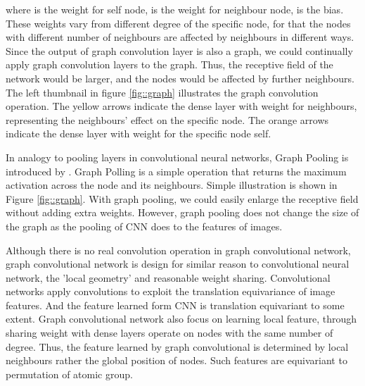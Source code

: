 \documentclass[letterpaper]{article} \usepackage{aaai18}  \usepackage{times}  \usepackage{helvet}  \usepackage{courier}  \usepackage{url}  \usepackage{graphicx}  \usepackage{amsmath}
\begin{document}
where  is the weight for self node,  is the weight for neighbour node,  is the bias. These weights vary from different degree  of the specific node, for that the nodes with different number of neighbours are affected by neighbours in different ways. Since the output of graph convolution layer is also a graph, we could continually apply graph convolution layers to the graph. Thus, the receptive field of the network would be larger, and the nodes would be affected by further neighbours. The left thumbnail in figure \ref{fig::graph} illustrates the graph convolution operation. The yellow arrows indicate the dense layer with weight  for neighbours, representing the neighbours' effect on the specific node. The orange arrows indicate the dense layer with weight  for the specific node self.

In analogy to pooling layers in convolutional neural networks, Graph Pooling is introduced by \cite{altae2017low}. Graph Polling is a simple operation that returns the maximum activation across the node and its neighbours. Simple illustration is shown in Figure \ref{fig::graph}. With graph pooling, we could easily enlarge the receptive field without adding extra weights. However, graph pooling does not change the size of the graph as the pooling of CNN does to the features of images.

Although there is no real convolution operation in graph convolutional network, graph convolutional network is design for similar reason to convolutional neural network, the 'local geometry' and reasonable weight sharing. Convolutional networks\cite{lecun1998gradient} apply convolutions to exploit the translation equivariance of image features. And the feature learned form CNN is translation equivariant to some extent. Graph convolutional network also focus on learning local feature, through sharing weight with dense layers operate on nodes with the same number of degree. Thus, the feature learned by graph convolutional is determined by local neighbours rather the global position of nodes. Such features are equivariant to permutation of atomic group.
\end{document}
